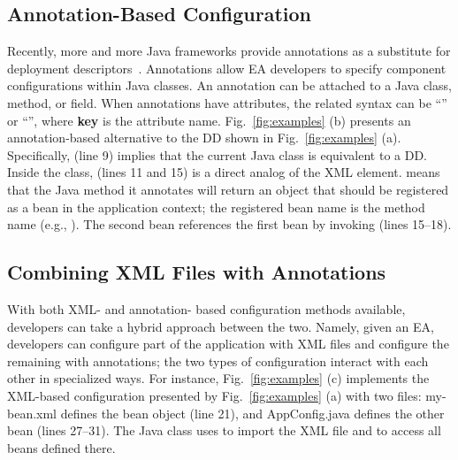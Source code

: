 \subsection{Annotation-Based Configuration}\label{ss:a}
Recently, more and more Java frameworks provide annotations as a substitute for deployment descriptors~\cite{javaee-anno,spring-anno}. Annotations allow EA developers to specify component configurations within Java classes. 
An annotation can be attached to a Java class, method, or field. When annotations have attributes, the related syntax can be ``'' or ``'', where \textbf{key} is the attribute name. 
 Fig.~\ref{fig:examples} (b) presents an annotation-based alternative to the DD shown in Fig.~\ref{fig:examples} (a). Specifically, \textbf{} (line 9) implies that the current Java class is equivalent to a DD. Inside the class, \textbf{} (lines 11 and 15) is a direct analog of the XML  element. \textbf{} 
means that the Java method it annotates will return an object that should be registered as a bean in the application context; the registered bean name is the method name (e.g., ). The second bean references the first bean by invoking  (lines 15--18). %


\vspace{-0.5em}
\subsection{Combining XML Files with Annotations}\label{ss:xanda}

With both XML- and annotation- based configuration methods available, developers can take a hybrid approach between the two. Namely, given an EA, developers can configure part of the application with XML files and configure the remaining with annotations;  
the two types of configuration interact with each other in specialized ways. 
For instance, Fig.~\ref{fig:examples} (c) implements the XML-based configuration presented by Fig.~\ref{fig:examples} (a) with two files: {\sf my-bean.xml} defines the bean object  (line 21), and {\sf AppConfig.java} defines the other bean  (lines 27--31). The Java class uses  to import the XML file and to access all beans defined there. 

